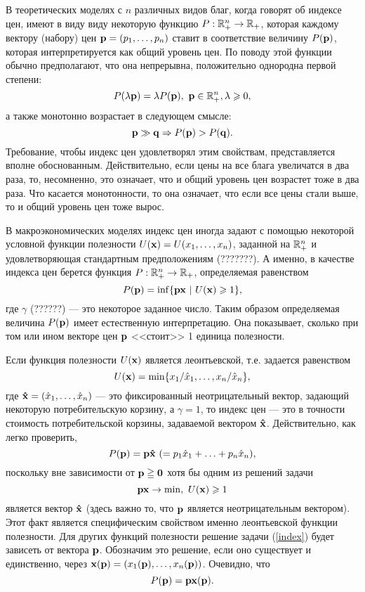     В теоретических моделях с $n$ различных видов благ, когда говорят об
    индексе цен, имеют в
    виду виду некоторую функцию $P:\mathbb{R}_{+}^{n}\rightarrow \mathbb{R}_{+}$,
    которая каждому вектору (набору) цен $\mathbf{p}=(p_{1},\ldots,p_{n})$
    ставит в соответствие величину $P(\mathbf{p})$, которая
    интерпретируется как общий уровень цен. По поводу этой функции
    обычно предполагают, что она непрерывна, положительно однородна
    первой степени:
    \[P(\lambda\mathbf{p})=\lambda P(\mathbf{p}), \ \mathbf{p}\in\mathbb{R}_{+}^{n}, \lambda\geqslant0,\]
    а также монотонно возрастает в следующем смысле:
    \[\mathbf{p}\gg\mathbf{q} \Rightarrow P(\mathbf{p})>P(\mathbf{q}).\]
    Требование, чтобы индекс цен удовлетворял этим свойствам,
    представляется вполне обоснованным. Действительно, если
    цены на все блага увеличатся в два раза, то, несомненно, это
    означает, что и общий уровень цен возрастет тоже в два раза. Что
    касается монотонности, то она означает, что если все цены стали
    выше, то и общий уровень цен тоже вырос.


    В макроэкономических моделях индекс цен иногда задают с помощью некоторой
    условной функции полезности $U(\mathbf{x})=U(x_{1},\ldots,x_{n})$,
    заданной на $\mathbb{R}_{+}^{n}$ и удовлетворяющая стандартным предположениям (???????).
    А именно, в качестве индекса цен берется функция $P:\mathbb{R}_{+}^{n}\rightarrow
    \mathbb{R}_{+}$, определяемая равенством
    \[P(\vc{p})=\inf\{\vc{p}\vc{x} \ | \ U(\vc{x})\geqslant1\},\]
    где $\gamma$ (??????) --- это некоторое заданное число. Таким образом определяемая величина
    $P(\mathbf{p})$ имеет естественную интерпретацию. Она показывает,
    сколько при том или ином векторе цен $\mathbf{p}$ <<стоит>> 1
    единица полезности.

    Если функция полезности $U(\mathbf{x})$ является леонтьевской, т.е. задается равенством
    \[U(\mathbf{x})=\min\{x_{1}/\hat{x}_{1},\ldots,x_{n}/\hat{x}_{n}\},\]
    где $\mathbf{\hat{x}}=(\hat{x}_{1},\ldots,\hat{x}_{n})$ --- это
    фиксированный неотрицательный вектор, задающий некоторую потребительскую корзину,
    а $\gamma=1$, то индекс цен --- это в точности стоимость
    потребительской корзины, задаваемой вектором $\mathbf{\hat{x}}$.
    Действительно, как легко проверить,
    \[P(\vc{p})=\vc{p}\vc{\hat{x}} \ (=p_{1}\hat{x}_{1}+\ldots+p_{n}\hat{x}_{n}),\]
    поскольку вне зависимости от $\mathbf{p}\geqq\mathbf{0}$ хотя бы одним из решений задачи
    \begin{equation}\label{index}
    \mathbf{p}\mathbf{x}\rightarrow\min, \ U(\mathbf{x})\geqslant1
    \end{equation}
        является вектор $\mathbf{\hat{x}}$ (здесь важно то, что $\mathbf{p}$ является неотрицательным
    вектором). Этот факт является специфическим свойством именно
    леонтьевской функции полезности. Для других функций полезности
    решение задачи (\ref{index}) будет зависеть от вектора $\mathbf{p}$.
    Обозначим это решение, если оно существует и единственно, через
    $\mathbf{x}(\mathbf{p})=(x_{1}(\mathbf{p}),\ldots,x_{n}(\mathbf{p}))$. Очевидно, что
    \[P(\mathbf{p})=\mathbf{p}\mathbf{x}(\mathbf{p}).\]




